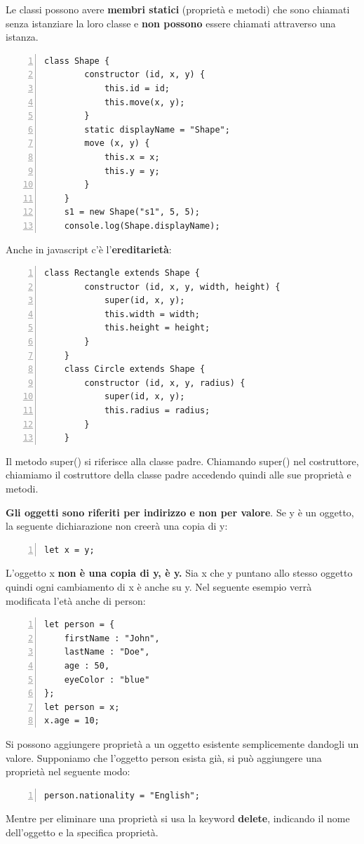 \begin{itemize}
    Le classi possono avere \textbf{membri statici} (proprietà e metodi) che sono chiamati senza istanziare la loro classe e \textbf{non possono} essere chiamati attraverso una istanza. 
    \begin{Verbatim}[numbers=left, frame=single]
    class Shape {
        constructor (id, x, y) {
            this.id = id;
            this.move(x, y);
        }
        static displayName = "Shape";
        move (x, y) {
            this.x = x;
            this.y = y;
        }
    }
    s1 = new Shape("s1", 5, 5);
    console.log(Shape.displayName);
    \end{Verbatim}
    Anche in javascript c'è l'\textbf{ereditarietà}:
    \begin{Verbatim}[numbers = left, frame=single]
    class Rectangle extends Shape {
        constructor (id, x, y, width, height) {
            super(id, x, y);
            this.width = width;
            this.height = height;
        }
    }
    class Circle extends Shape {
        constructor (id, x, y, radius) {
            super(id, x, y);
            this.radius = radius;
        }
    }
    \end{Verbatim}
    Il metodo super() si riferisce alla classe padre. Chiamando super() nel costruttore, chiamiamo il costruttore della classe padre accedendo quindi alle sue proprietà e metodi.
\end{itemize}

\textbf{Gli oggetti sono riferiti per indirizzo e non per valore}. Se y è un oggetto, la seguente dichiarazione non creerà una copia di y:
\begin{Verbatim}[numbers=left, frame=single]
let x = y;
\end{Verbatim}
L'oggetto x \textbf{non è una copia di y, è y.} Sia x che y puntano allo stesso oggetto quindi ogni cambiamento di x è anche su y. Nel seguente esempio verrà modificata l'età anche di person:
\begin{Verbatim}[numbers=left, frame=single]
let person = {
    firstName : "John",
    lastName : "Doe",
    age : 50,
    eyeColor : "blue"
};
let person = x;
x.age = 10;
\end{Verbatim}
Si possono aggiungere proprietà a un oggetto esistente semplicemente dandogli un valore. Supponiamo che l'oggetto person esista già, si può aggiungere una proprietà nel seguente modo:
\begin{Verbatim}[numbers=left, frame=single]
person.nationality = "English";
\end{Verbatim}
Mentre per eliminare una proprietà si usa la keyword \textbf{delete}, indicando il nome dell'oggetto e la specifica proprietà.


